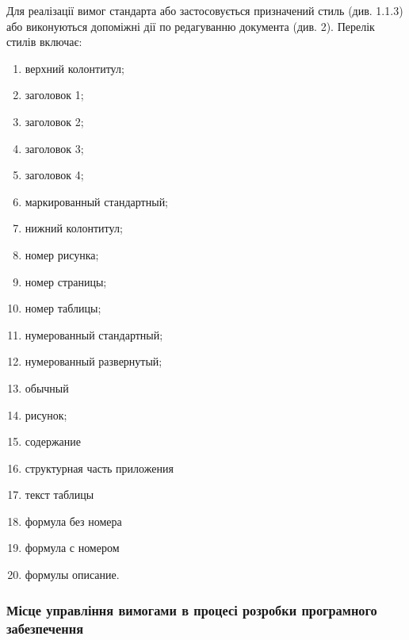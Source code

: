 Для реалізації вимог стандарта або застосовується призначений стиль (див. 1.1.3) або виконуються допоміжні дії по редагуванню документа (див. 2). Перелік стилів включає:
\begin{enumerate}
\item верхний колонтитул;
\item заголовок 1;
\item заголовок 2;
\item заголовок 3;
\item заголовок 4;
\item маркированный стандартный;
\item нижний колонтитул;
\item номер рисунка;
\item номер страницы;
\item номер таблицы;
\item нумерованный стандартный;
\item нумерованный развернутый;
\item обычный
\item рисунок;
\item содержание
\item структурная часть приложения
\item текст таблицы
\item формула без номера
\item формула с номером
\item формулы описание.
\end{enumerate}

\subsubsection{Місце управління вимогами в процесі розробки програмного
забезпечення}

